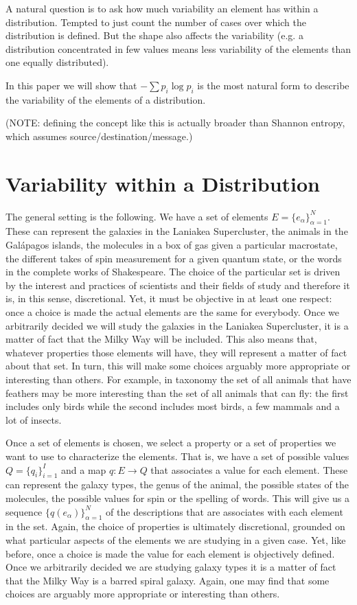 \documentclass{article}
\begin{document}
A natural question is to ask how much variability an element has within a distribution. Tempted to just count the number of cases over which the distribution is defined. But the shape also affects the variability (e.g. a distribution concentrated in few values means less variability of the elements than one equally distributed).

In this paper we will show that $- \sum p_i \log p_i$ is the most natural form to describe the variability of the elements of a distribution.

(NOTE: defining the concept like this is actually broader than Shannon entropy, which assumes source/destination/message.)

\section{Variability within a Distribution\label{vwd}}

The general setting is the following. We have a set of elements $E = \{e_\alpha\}_{\alpha=1}^N$. These can represent the galaxies in the Laniakea Supercluster, the animals in the Gal\'{a}pagos islands, the molecules in a box of gas given a particular macrostate, the different takes of spin measurement for a given quantum state, or the words in the complete works of Shakespeare. The choice of the particular set is driven by the interest and practices of scientists and their fields of study and therefore it is, in this sense, discretional. Yet, it must be objective in at least one respect: once a choice is made the actual elements are the same for everybody. Once we arbitrarily decided we will study the galaxies in the Laniakea Supercluster, it is a matter of fact that the Milky Way will be included. This also means that, whatever properties those elements will have, they will represent a matter of fact about that set. In turn, this will make some choices arguably more appropriate or interesting than others. For example, in taxonomy the set of all animals that have feathers may be more interesting than the set of all animals that can fly: the first includes only birds while the second includes most birds, a few mammals and a lot of insects.

Once a set of elements is chosen, we select a property or a set of properties we want to use to characterize the elements. That is, we have a set of possible values $Q=\{q_i\}_{i=1}^I$ and a map $q : E \to Q$ that associates a value for each element. These can represent the galaxy types, the genus of the animal, the possible states of the molecules, the possible values for spin or the spelling of words. This will give us a sequence $\{q(e_\alpha)\}_{\alpha=1}^N$ of the descriptions that are associates with each element in the set. Again, the choice of properties is ultimately discretional, grounded on what particular aspects of the elements we are studying in a given case. Yet, like before, once a choice is made the value for each element is objectively defined. Once we arbitrarily decided we are studying galaxy types it is a matter of fact that the Milky Way is a barred spiral galaxy. Again, one may find that some choices are arguably more appropriate or interesting than others.
\end{document}
